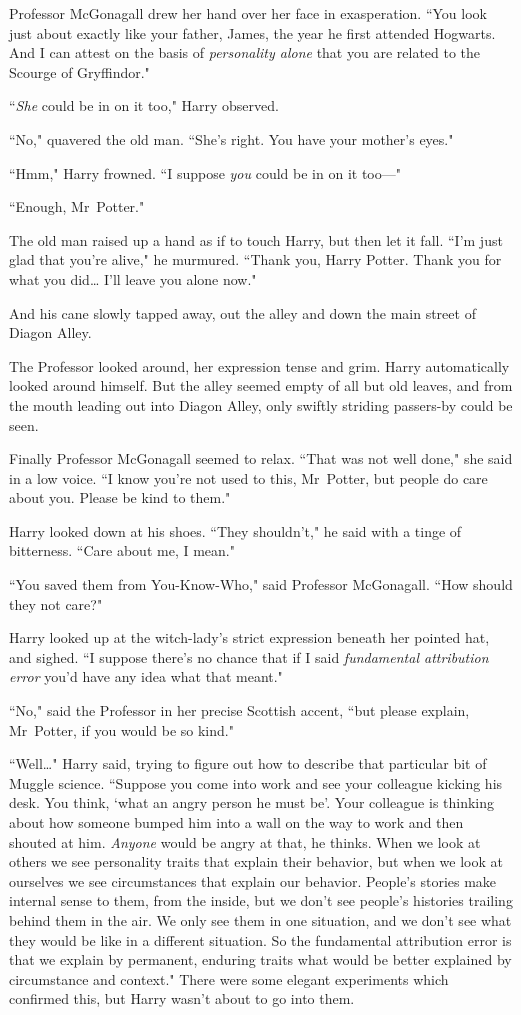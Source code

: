 Professor McGonagall drew her hand over her face in exasperation. ``You look just about exactly like your father, James, the year he first attended Hogwarts. And I can attest on the basis of \emph{personality alone} that you are related to the Scourge of Gryffindor."

``\emph{She} could be in on it too," Harry observed.

``No," quavered the old man. ``She's right. You have your mother's eyes."

``Hmm," Harry frowned. ``I suppose \emph{you} could be in on it too—"

``Enough, Mr~Potter."

The old man raised up a hand as if to touch Harry, but then let it fall. ``I'm just glad that you're alive," he murmured. ``Thank you, Harry Potter. Thank you for what you did{\ldots} I'll leave you alone now."

And his cane slowly tapped away, out the alley and down the main street of Diagon Alley.

The Professor looked around, her expression tense and grim. Harry automatically looked around himself. But the alley seemed empty of all but old leaves, and from the mouth leading out into Diagon Alley, only swiftly striding passers-by could be seen.

Finally Professor McGonagall seemed to relax. ``That was not well done," she said in a low voice. ``I know you're not used to this, Mr~Potter, but people do care about you. Please be kind to them."

Harry looked down at his shoes. ``They shouldn't," he said with a tinge of bitterness. ``Care about me, I mean."

``You saved them from You-Know-Who," said Professor McGonagall. ``How should they not care?"

Harry looked up at the witch-lady's strict expression beneath her pointed hat, and sighed. ``I suppose there's no chance that if I said \emph{fundamental attribution error} you'd have any idea what that meant."

``No," said the Professor in her precise Scottish accent, ``but please explain, Mr~Potter, if you would be so kind."

``Well{\ldots}" Harry said, trying to figure out how to describe that particular bit of Muggle science. ``Suppose you come into work and see your colleague kicking his desk. You think, `what an angry person he must be'. Your colleague is thinking about how someone bumped him into a wall on the way to work and then shouted at him. \emph{Anyone} would be angry at that, he thinks. When we look at others we see personality traits that explain their behavior, but when we look at ourselves we see circumstances that explain our behavior. People's stories make internal sense to them, from the inside, but we don't see people's histories trailing behind them in the air. We only see them in one situation, and we don't see what they would be like in a different situation. So the fundamental attribution error is that we explain by permanent, enduring traits what would be better explained by circumstance and context." There were some elegant experiments which confirmed this, but Harry wasn't about to go into them.

